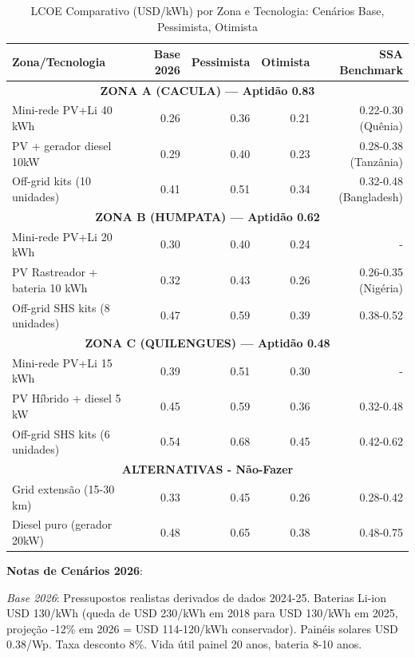 \documentclass[12pt, a4paper]{article}
\begin{document}
\begin{table}[H]
\centering
\caption{LCOE Comparativo (USD/kWh) por Zona e Tecnologia: Cenários Base, Pessimista, Otimista}
\label{tab:lcoe_scenarios}
\small
\begin{tabular}{|l|r|r|r|r|}
\hline
\textbf{Zona/Tecnologia} & \textbf{Base 2026} & \textbf{Pessimista} & \textbf{Otimista} & \textbf{SSA Benchmark} \\
\hline
\multicolumn{5}{|c|}{\textbf{ZONA A (CACULA) --- Aptidão 0.83}} \\
\hline
Mini-rede PV+Li 40 kWh & 0.26 & 0.36 & 0.21 & 0.22-0.30 (Quênia) \\
PV + gerador diesel 10kW & 0.29 & 0.40 & 0.23 & 0.28-0.38 (Tanzânia) \\
Off-grid kits (10 unidades) & 0.41 & 0.51 & 0.34 & 0.32-0.48 (Bangladesh) \\
\hline
\multicolumn{5}{|c|}{\textbf{ZONA B (HUMPATA) --- Aptidão 0.62}} \\
\hline
Mini-rede PV+Li 20 kWh & 0.30 & 0.40 & 0.24 & - \\
PV Rastreador + bateria 10 kWh & 0.32 & 0.43 & 0.26 & 0.26-0.35 (Nigéria) \\
Off-grid SHS kits (8 unidades) & 0.47 & 0.59 & 0.39 & 0.38-0.52 \\
\hline
\multicolumn{5}{|c|}{\textbf{ZONA C (QUILENGUES) --- Aptidão 0.48}} \\
\hline
Mini-rede PV+Li 15 kWh & 0.39 & 0.51 & 0.30 & - \\
PV Híbrido + diesel 5 kW & 0.45 & 0.59 & 0.36 & 0.32-0.48 \\
Off-grid SHS kits (6 unidades) & 0.54 & 0.68 & 0.45 & 0.42-0.62 \\
\hline
\multicolumn{5}{|c|}{\textbf{ALTERNATIVAS - Não-Fazer}} \\
\hline
Grid extensão (15-30 km) & 0.33 & 0.45 & 0.26 & 0.28-0.42 \\
Diesel puro (gerador 20kW) & 0.48 & 0.65 & 0.38 & 0.48-0.75 \\
\hline
\end{tabular}
\end{table}

\textbf{Notas de Cenários 2026}:

\textit{Base 2026}: Pressupostos realistas derivados de dados 2024-25. Baterias Li-ion USD 130/kWh (queda de USD 230/kWh em 2018 para USD 130/kWh em 2025, projeção -12\% em 2026 = USD 114-120/kWh conservador). Painéis solares USD 0.38/Wp. Taxa desconto 8\%. Vida útil painel 20 anos, bateria 8-10 anos.
\end{document}
